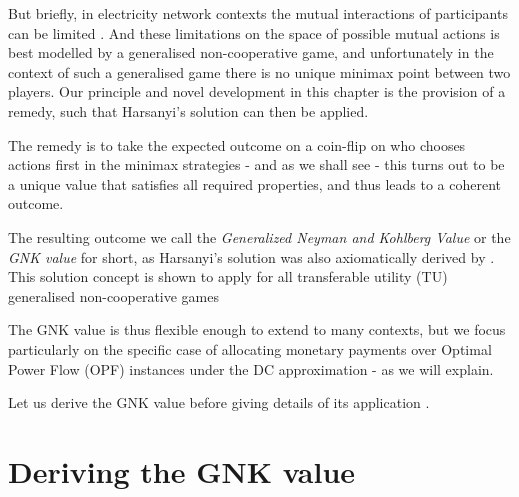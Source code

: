 But briefly, in electricity network contexts the mutual interactions of participants can be limited \DIFaddbegin {}\DIFaddend .
And these limitations on the space of possible mutual actions is best modelled by a generalised non-cooperative game, and unfortunately in the context of such a generalised game there is no unique minimax point between two players.
Our principle and novel development in this chapter is the provision of a remedy, such that Harsanyi's solution can then be applied.
\DIFdelbegin %

\DIFdelend The remedy is to take the expected outcome on a coin-flip on who chooses actions first in the minimax strategies - and as we shall see - this turns out to be a unique value that satisfies all required properties, and thus leads to a coherent outcome.

The resulting outcome we call the \textit{Generalized Neyman and Kohlberg Value} or the \textit{GNK value} for short, 
as Harsanyi's solution was also axiomatically derived by \cite{value2,KOHLBERG2018139}.
This solution concept is shown to apply for all transferable utility (TU) generalised non-cooperative games\DIFdelbegin {}\DIFdelend \DIFaddbegin {}

\DIFaddend The GNK value is thus flexible enough to extend to many contexts, but we focus particularly on the specific case of allocating monetary payments over Optimal Power Flow (OPF) instances under the DC approximation - as we will explain.

Let us derive the GNK value \DIFaddbegin {}\DIFaddend before giving details of its application \DIFaddbegin {}\DIFaddend .

\section{Deriving the GNK value}\label{the_value_def2}

